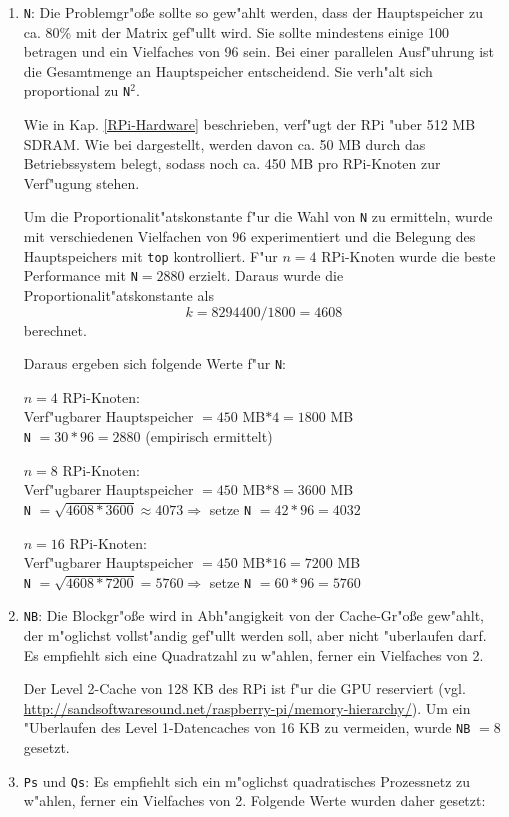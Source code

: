 \begin{enumerate} 
	\item \texttt{N}: Die Problemgr"o\ss e sollte so gew"ahlt werden, dass der Hauptspeicher zu ca. 80\% mit der Matrix gef"ullt wird. Sie sollte mindestens einige 100 betragen und ein Vielfaches von 96 sein. Bei einer parallelen Ausf"uhrung ist die Gesamtmenge an Hauptspeicher entscheidend. Sie verh"alt sich proportional zu \texttt{N}$^2$. 
	
Wie in Kap. \ref{RPi-Hardware} beschrieben, verf"ugt der RPi "uber 512 MB SDRAM. Wie bei \cite{kli13} dargestellt, werden davon ca. 50 MB durch das Betriebssystem belegt, sodass noch ca. 450 MB pro RPi-Knoten zur Verf"ugung stehen. 

Um die Proportionalit"atskonstante f"ur die Wahl von \texttt{N} zu ermitteln, wurde mit verschiedenen Vielfachen von 96 experimentiert und die Belegung des Hauptspeichers mit \texttt{top} kontrolliert. F"ur $n=4$ RPi-Knoten wurde die beste Performance mit \texttt{N}$=2880$ erzielt. Daraus wurde die Proportionalit"atskonstante als \[k=8294400/1800=4608\] berechnet. 

Daraus ergeben sich folgende Werte f"ur \texttt{N}:

$n=4$ RPi-Knoten:\\
Verf"ugbarer Hauptspeicher $=450$ MB$\ast 4=1800$ MB\\
\texttt{N} $=30\ast 96=2880$ (empirisch ermittelt)

$n=8$ RPi-Knoten:\\
Verf"ugbarer Hauptspeicher $=450$ MB$\ast 8=3600$ MB\\
\texttt{N} $=\sqrt{4608\ast 3600}\approx 4073\Rightarrow$ setze \texttt{N} $=42\ast 96=4032$

$n=16$ RPi-Knoten:\\
Verf"ugbarer Hauptspeicher $=450$ MB$\ast 16=7200$ MB\\
\texttt{N} $=\sqrt{4608\ast 7200}=5760\Rightarrow$ setze \texttt{N} $=60\ast 96=5760$	
	\item \texttt{NB}: Die Blockgr"o\ss e wird in Abh"angigkeit von der Cache-Gr"o\ss e gew"ahlt, der m"oglichst vollst"andig gef"ullt werden soll, aber nicht "uberlaufen darf. Es empfiehlt sich eine Quadratzahl zu w"ahlen, ferner ein Vielfaches von 2. 

Der Level 2-Cache von 128 KB des RPi ist f"ur die GPU reserviert (vgl. \url{http://sandsoftwaresound.net/raspberry-pi/memory-hierarchy/}). Um ein "Uberlaufen des Level 1-Datencaches von 16 KB zu vermeiden, wurde \texttt{NB} $= 8$ gesetzt. 
	\item \texttt{Ps} und \texttt{Qs}: Es empfiehlt sich ein m"oglichst quadratisches Prozessnetz zu w"ahlen, ferner ein Vielfaches von 2. Folgende Werte wurden daher gesetzt: 
	

\end{enumerate}
